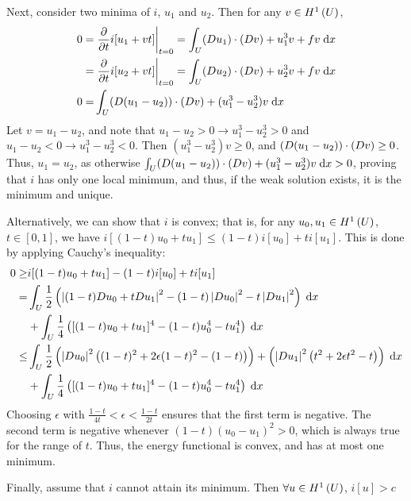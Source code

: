 Next, consider two minima of $i$, $u_1$ and $u_2$.
Then for any $v \in H^{1}\left(U \right)$,
\begin{align*}
  0 = &\left. \frac{\partial }{\partial t} i[u_1 + v t] \right\rvert_{t = 0}
    = \int_U (D u_1) \cdot (D v) + u_1^3 v + f v \;\mathrm{d}x\\
    = &\left. \frac{\partial }{\partial t} i[u_2 + v t] \right\rvert_{t = 0}
    = \int_U (D u_2) \cdot (D v) + u_2^3 v + f v \;\mathrm{d}x\\
  0 = &\int_U (D (u_1 - u_2)) \cdot (D v) + (u_1^3 - u_2^3) v \;\mathrm{d}x
\end{align*}
Let $v = u_1 - u_2$, and note that $u_1 - u_2 > 0 \rightarrow u_1^3 - u_2^3 > 0$
and $u_1 - u_2 < 0 \rightarrow u_1^3 - u_2^3 < 0$.
Then $(u_1^3 - u_2^3) v \geq 0$, and $(D (u_1 - u_2)) \cdot (D v) \geq 0$.
Thus, $u_1 = u_2$, as otherwise
$\int_U (D (u_1 - u_2)) \cdot (D v) + (u_1^3 - u_2^3) v \;\mathrm{d}x > 0$,
proving that $i$ has only one local minimum, and thus,
if the weak solution exists, it is the minimum and unique.

Alternatively, we can show that $i$ is convex; that is, for any $u_0, u_1 \in H^{1}\left(U \right)$,
$t \in [0, 1]$, we have $i[(1 - t) u_0 + t u_1] \leq (1 - t) i[u_0] + t i[u_1]$.
This is done by applying Cauchy's inequality:
\begin{align*}
 0 \geq &i[(1 - t) u_0 + t u_1] - (1 - t) i[u_0] + t i[u_1]\\
   = &\int_{U} \frac{1}{2} \left(
         \left\lvert (1 - t) D u_0 + t D u_1 \right \rvert^2
           - (1 - t) \left\lvert D u_0 \right\rvert^2
           - t \left\lvert D u_1 \right\rvert^2 \right) \;\mathrm{d}x\\
     &+ \int_{U} \frac{1}{4} \left(
         [(1 - t) u_0 + t u_1]^4
         - (1 - t) u_0^4 - t u_1^4 \right) \;\mathrm{d}x\\
   \leq &\int_{U} \frac{1}{2}
           \left(\left\lvert D u_0 \right\rvert^2 \left( (1 - t)^2 + 2 \epsilon (1 - t)^2 - (1 - t) \right) \right)
           + \left(\left\lvert D u_1 \right\rvert^2 \left( t^2 + 2 \epsilon t^2 - t \right) \right) \;\mathrm{d}x\\
        &+ \int_{U} \frac{1}{4} \left(
          [(1 - t) u_0 + t u_1]^4 - (1 - t) u_0^4 - t u_1^4 \right) \;\mathrm{d}x\\
\end{align*}
Choosing $\epsilon$ with $\frac{1 - t}{4 t} < \epsilon < \frac{1 - t}{2 t}$
ensures that the first term is negative.
The second term is negative whenever $(1 - t) (u_0 - u_1)^2 > 0$, which is always true for the range of $t$.
Thus, the energy functional is convex, and has at most one minimum.

Finally, assume that $i$ cannot attain its minimum.
Then $\forall u \in H^{1}\left(U \right)$,
$i[u] > c$
\newpage
